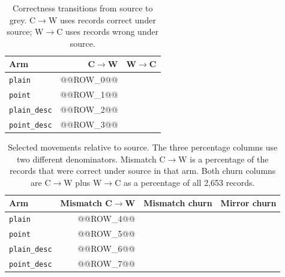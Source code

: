 \begin{table}[ht]
\centering
\caption[Grey correctness transitions]{Correctness transitions from source to
grey. C$\rightarrow$W uses records correct under source; W$\rightarrow$C uses
records wrong under source.}
\label{tab:rq1-transitions-compact}
\begin{tabular}{lrr}
\toprule
Arm & C$\rightarrow$W & W$\rightarrow$C \\
\midrule
\texttt{plain} & @@ROW_0@@ \\
\texttt{point} & @@ROW_1@@ \\
\texttt{plain\_desc} & @@ROW_2@@ \\
\texttt{point\_desc} & @@ROW_3@@ \\
\bottomrule
\end{tabular}
\end{table}

\begin{table}[ht]
\centering
\caption[Mismatch and mirror correctness movement]{Selected movements relative
to source. The three percentage columns use two different denominators. Mismatch
C$\rightarrow$W is a percentage of the records that were correct under source in
that arm. Both churn columns are C$\rightarrow$W plus W$\rightarrow$C as a
percentage of all 2,653 records.}
\label{tab:rq1-churn-compact}
\begin{tabular}{lrrr}
\toprule
Arm & Mismatch C$\rightarrow$W & Mismatch churn & Mirror churn \\
\midrule
\texttt{plain} & @@ROW_4@@ \\
\texttt{point} & @@ROW_5@@ \\
\texttt{plain\_desc} & @@ROW_6@@ \\
\texttt{point\_desc} & @@ROW_7@@ \\
\bottomrule
\end{tabular}
\end{table}
